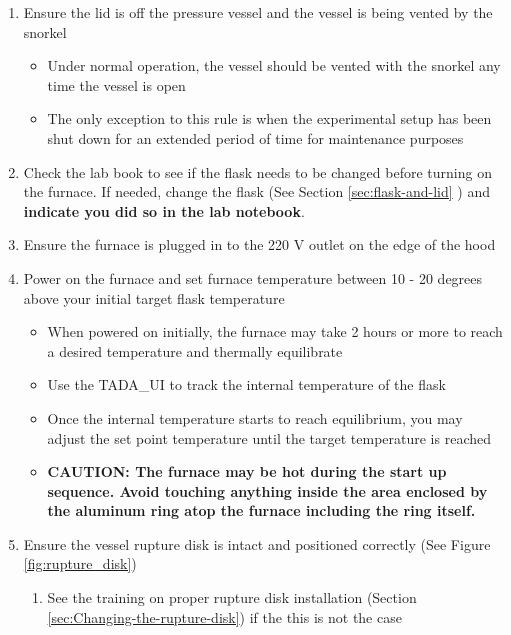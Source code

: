 \begin{enumerate}
\def\labelenumi{\arabic{enumi}.}
\item
  Ensure the lid is off the pressure vessel and the vessel is being
  vented by the snorkel

  \begin{itemize}
  \tightlist
  \item
    Under normal operation, the vessel should be vented with the snorkel
    any time the vessel is open
  \item
    The only exception to this rule is when the experimental setup has
    been shut down for an extended period of time for maintenance
    purposes
  \end{itemize}
\item
  Check the lab book to see if the flask needs to be changed before
  turning on the furnace. If needed, change the flask (See Section
  \ref{sec:flask-and-lid} ) and \textbf{indicate you did so in the lab
  notebook}.
\item
  Ensure the furnace is plugged in to the 220 V outlet on the edge of
  the hood
\item
  Power on the furnace and set furnace temperature between 10 - 20
  degrees above your initial target flask temperature

  \begin{itemize}
  \tightlist
  \item
    When powered on initially, the furnace may take 2 hours or more to
    reach a desired temperature and thermally equilibrate
  \item
    Use the TADA\_UI to track the internal temperature of the flask
  \item
    Once the internal temperature starts to reach equilibrium, you may
    adjust the set point temperature until the target temperature is
    reached
  \item
    \textbf{CAUTION: The furnace may be hot during the start up
    sequence. Avoid touching anything inside the area enclosed by the
    aluminum ring atop the furnace including the ring itself.}
  \end{itemize}
\item
  Ensure the vessel rupture disk is intact and positioned correctly (See
  Figure \ref{fig:rupture_disk})

  \begin{enumerate}
  \def\labelenumii{\arabic{enumii}.}
  \tightlist
  \item
    See the training on proper rupture disk installation (Section
    \ref{sec:Changing-the-rupture-disk}) if the this is not the case
  \end{enumerate}


\end{enumerate}

